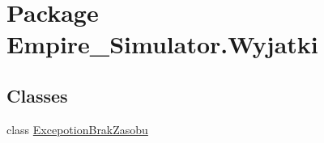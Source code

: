 \hypertarget{namespace_empire___simulator_1_1_wyjatki}{\section{Package Empire\+\_\+\+Simulator.\+Wyjatki}
\label{namespace_empire___simulator_1_1_wyjatki}
}
\subsection*{Classes}
\begin{DoxyCompactItemize}
\item 
class \hyperlink{class_empire___simulator_1_1_wyjatki_1_1_excepotion_brak_zasobu}{Excepotion\+Brak\+Zasobu}
\end{DoxyCompactItemize}
